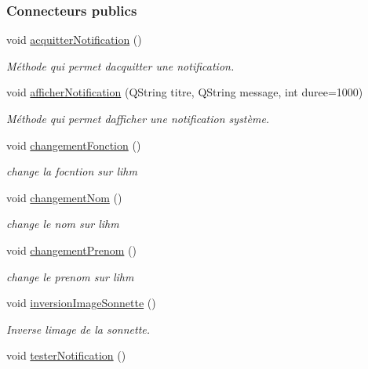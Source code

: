 \subsubsection*{Connecteurs publics}
\begin{DoxyCompactItemize}
\item 
void \hyperlink{class_ihm_groom_a428ffaecbab91abb0824ad61afd3109e}{acquitter\+Notification} ()
\begin{DoxyCompactList}\small\item\em Méthode qui permet d\textquotesingle{}acquitter une notification. \end{DoxyCompactList}\item 
void \hyperlink{class_ihm_groom_a55194db52eca3648aad391274a6bb709}{afficher\+Notification} (Q\+String titre, Q\+String message, int duree=1000)
\begin{DoxyCompactList}\small\item\em Méthode qui permet d\textquotesingle{}afficher une notification système. \end{DoxyCompactList}\item 
void \hyperlink{class_ihm_groom_afc6c48489b270b22a660e32668d6b2ca}{changement\+Fonction} ()
\begin{DoxyCompactList}\small\item\em change la focntion sur l\textquotesingle{}ihm \end{DoxyCompactList}\item 
void \hyperlink{class_ihm_groom_aa270d1fb6a7a9c1385c4ae3e67451ea0}{changement\+Nom} ()
\begin{DoxyCompactList}\small\item\em change le nom sur l\textquotesingle{}ihm \end{DoxyCompactList}\item 
void \hyperlink{class_ihm_groom_a2e8db190224f15326552a5bd642a9347}{changement\+Prenom} ()
\begin{DoxyCompactList}\small\item\em change le prenom sur l\textquotesingle{}ihm \end{DoxyCompactList}\item 
void \hyperlink{class_ihm_groom_a6a7d6102f1d90172215fd4f1aae6e166}{inversion\+Image\+Sonnette} ()
\begin{DoxyCompactList}\small\item\em Inverse l\textquotesingle{}image de la sonnette. \end{DoxyCompactList}\item 
void \hyperlink{class_ihm_groom_a53838a4bd054fe5c85c23eced3eacc8b}{tester\+Notification} ()
\end{DoxyCompactItemize}
